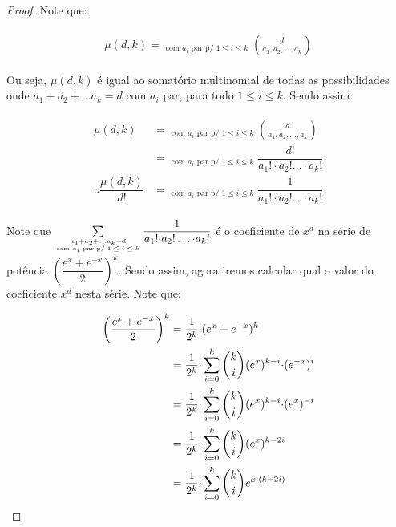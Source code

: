 \begin{proof} 
	Note que: \newl
	
	\begin{align}
		\begin{split}
			\mu(d, k) =  \mathop{\sum_{a_1 + a_2 + \ldots a_k = d}}_{\text{com $a_i$ par p/ $1 \leq i \leq k$}}\binom{d}{a_1, a_2, \ldots, a_k} 
		\end{split} 
	\end{align}
	
	Ou seja, $\mu(d, k)$ é igual ao somatório multinomial de todas as possibilidades onde $a_1 + a_2 + \ldots a_k = d$ com $a_i$ par, para todo $1 \leq i \leq k$. Sendo assim:
	
	\begin{align}
		\begin{split}
			\label{l6_1}
			\mu(d, k) &=  \mathop{\sum_{a_1 + a_2 + \ldots a_k = d}}_{\text{com $a_i$ par p/ $1 \leq i \leq k$}}\binom{d}{a_1, a_2, \ldots, a_k} \\
			&= \mathop{\sum_{a_1 + a_2 + \ldots a_k = d}}_{\text{com $a_i$ par p/ $1 \leq i \leq k$}}\dfrac{d!}{a_1! {\cdot} a_2! \ldots {\cdot} a_k!} \\
			\therefore \dfrac{\mu(d, k)}{d!} &= \mathop{\sum_{a_1 + a_2 + \ldots a_k = 2}}_{\text{com $a_i$ par p/ $1 \leq i \leq k$}}\dfrac{1}{a_1! {\cdot} a_2! \ldots {\cdot} a_k!}
		\end{split} 
	\end{align}
	
	
	Note que $\sum\limits_{a_1 + a_2 + \ldots a_k = d \atop \text{com $a_i$ par p/ $1 \leq i \leq k$}} \dfrac{1}{a_1! {\cdot} a_2! \ldots {\cdot} a_k!}$ é o coeficiente de $x^{d}$ na série de potência $\left(\dfrac{e^x + e^{-x}}{2}\right)^k$. Sendo assim, agora iremos calcular qual o valor do coeficiente $x^{d}$ nesta série. Note que:
	
	\begin{align}
		\begin{split}
			\label{l6_2}
			\left(\dfrac{e^x + e^{-x}}{2}\right)^k &= \dfrac{1}{2^k} {\cdot} (e^x + e^{-x})^k \\
			&= \dfrac{1}{2^k} {\cdot} \sum\limits_{i = 0}^{k}\escolhe{k}{i}(e^x)^{k-i} {\cdot} (e^{-x})^i \\
			&= \dfrac{1}{2^k} {\cdot} \sum\limits_{i = 0}^{k}\escolhe{k}{i}(e^x)^{k-i} {\cdot} (e^{x})^{-i} \\
			&= \dfrac{1}{2^k} {\cdot} \sum\limits_{i = 0}^{k}\escolhe{k}{i}(e^x)^{k-2i}  \\
			&= \dfrac{1}{2^k} {\cdot} \sum\limits_{i = 0}^{k}\escolhe{k}{i}e^{x {\cdot}(k - 2i)}
		\end{split} 
	\end{align}
	

\end{proof}
